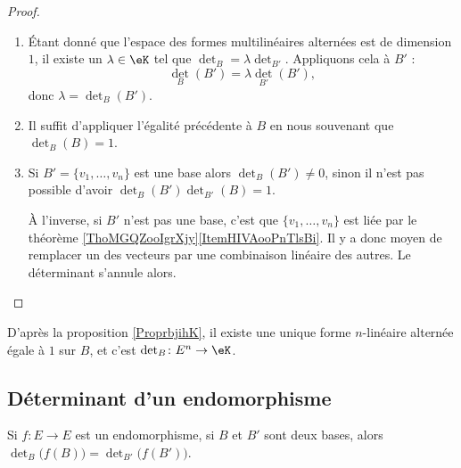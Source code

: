 \begin{proof}
\begin{enumerate}
        \item
            Étant donné que l'espace des formes multilinéaires alternées est de dimension \( 1\), il existe un \( \lambda\in \eK\) tel que \( \det_B=\lambda\det_{B'}\). Appliquons cela à \( B'\) :
            \begin{equation}
                \det_B(B')=\lambda\det_{B'}(B'),
            \end{equation}
            donc \( \lambda=\det_B(B')\).
        \item
            Il suffit d'appliquer l'égalité précédente à \( B\) en nous souvenant que \( \det_B(B)=1\).
        \item
            Si \( B'=\{ v_1,\ldots, v_n \}\) est une base alors \( \det_B(B')\neq 0\), sinon il n'est pas possible d'avoir \( \det_B(B')\det_{B'}(B)=1\).

            À l'inverse, si \( B'\) n'est pas une base, c'est que \( \{ v_1,\ldots, v_n \}\) est liée par le théorème \ref{ThoMGQZooIgrXjy}\ref{ItemHIVAooPnTlsBi}. Il y a donc moyen de remplacer un des vecteurs par une combinaison linéaire des autres. Le déterminant s'annule alors.
    \end{enumerate}
\end{proof}

D'après la proposition \ref{ProprbjihK}, il existe une unique forme \( n\)-linéaire alternée égale à \( 1\) sur \( B\), et c'est \( \det_B\colon E^n\to \eK\).

\subsection{Déterminant d'un endomorphisme}

\begin{lemma}
    Si \( f\colon E\to E\) est un endomorphisme, si \( B\) et \( B'\) sont deux bases, alors \( \det_B\big( f(B) \big)=\det_{B'}\big( f(B') \big)  \).
\end{lemma}

